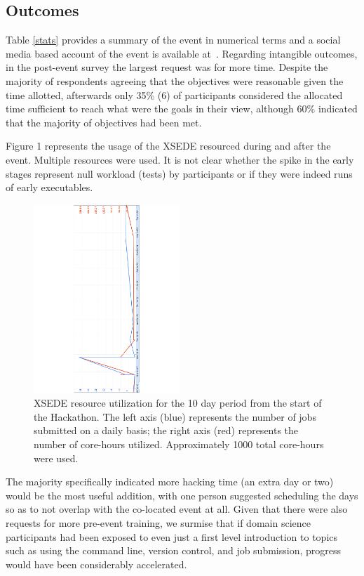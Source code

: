 \documentclass[conference]{IEEEtran}
\begin{document}
\subsection{Outcomes}
Table \ref{stats} provides a summary of the event in numerical terms and a social media based account of the event is available at~\cite{noauthor_undated-az}.  Regarding intangible outcomes, in the post-event survey the largest request was for more time.  Despite the majority of respondents agreeing that the objectives were reasonable given the time allotted, afterwards only 35\% (6) of participants considered the allocated time sufficient to reach what were the goals in their view, although 60\% indicated that the majority of objectives had been met.  

Figure 1 represents the usage of the XSEDE resourced during and after the
event. Multiple resources were used. It is not clear whether the spike in the
early stages represent null workload (tests) by participants or if they were
indeed runs of early executables. 

\begin{figure}
\includegraphics[width=0.49\textwidth]{hack-xsede-usage}
\caption{\footnotesize XSEDE resource utilization for the 10 day period from the start of the Hackathon. The left axis (blue) represents the number of jobs submitted on a daily basis; the right axis (red) represents the number of core-hours utilized. Approximately 1000 total core-hours were used.}
\label{fig:xsede-usage} 
\end{figure}


The majority specifically indicated more hacking time (an extra day or two) would be the most useful addition, with one person suggested scheduling the days so as to not overlap with the co-located event at all.  Given that there were also requests for more pre-event training, we surmise that if domain science participants had been exposed to even just a first level introduction to topics such as using the command line, version control, and job submission, progress would have been considerably accelerated.
\end{document}
